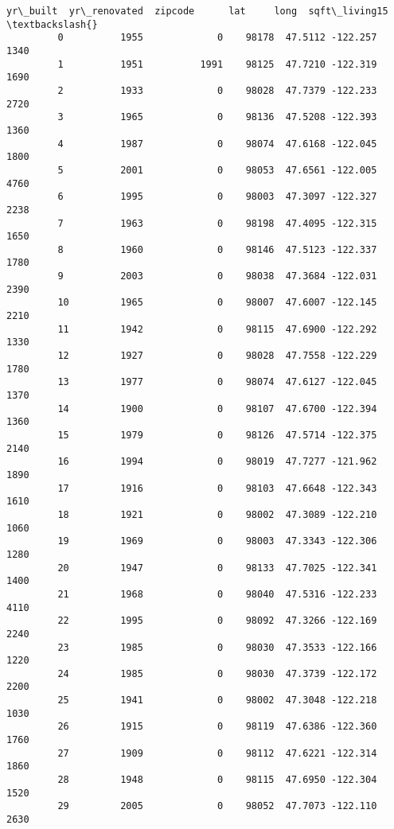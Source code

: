 \documentclass[11pt]{article}
\begin{document}
\begin{Verbatim}[commandchars=\\\{\}]
                yr\_built  yr\_renovated  zipcode      lat     long  sqft\_living15  \textbackslash{}
         0          1955             0    98178  47.5112 -122.257           1340   
         1          1951          1991    98125  47.7210 -122.319           1690   
         2          1933             0    98028  47.7379 -122.233           2720   
         3          1965             0    98136  47.5208 -122.393           1360   
         4          1987             0    98074  47.6168 -122.045           1800   
         5          2001             0    98053  47.6561 -122.005           4760   
         6          1995             0    98003  47.3097 -122.327           2238   
         7          1963             0    98198  47.4095 -122.315           1650   
         8          1960             0    98146  47.5123 -122.337           1780   
         9          2003             0    98038  47.3684 -122.031           2390   
         10         1965             0    98007  47.6007 -122.145           2210   
         11         1942             0    98115  47.6900 -122.292           1330   
         12         1927             0    98028  47.7558 -122.229           1780   
         13         1977             0    98074  47.6127 -122.045           1370   
         14         1900             0    98107  47.6700 -122.394           1360   
         15         1979             0    98126  47.5714 -122.375           2140   
         16         1994             0    98019  47.7277 -121.962           1890   
         17         1916             0    98103  47.6648 -122.343           1610   
         18         1921             0    98002  47.3089 -122.210           1060   
         19         1969             0    98003  47.3343 -122.306           1280   
         20         1947             0    98133  47.7025 -122.341           1400   
         21         1968             0    98040  47.5316 -122.233           4110   
         22         1995             0    98092  47.3266 -122.169           2240   
         23         1985             0    98030  47.3533 -122.166           1220   
         24         1985             0    98030  47.3739 -122.172           2200   
         25         1941             0    98002  47.3048 -122.218           1030   
         26         1915             0    98119  47.6386 -122.360           1760   
         27         1909             0    98112  47.6221 -122.314           1860   
         28         1948             0    98115  47.6950 -122.304           1520   
         29         2005             0    98052  47.7073 -122.110           2630   

\end{Verbatim}
\end{document}
